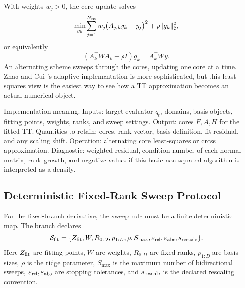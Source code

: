 \documentclass[11pt]{article}
\numberwithin{equation}{section}
\begin{document}
With weights \(w_j>0\), the core update solves
\begin{equation}
    \min_{g_k}
    \sum_{j=1}^{N_{\rm fit}}w_j\bigl(A_{j,k}g_k-y_j\bigr)^2
    +\rho\|g_k\|_2^2,
    \label{eq:p24-a1-2c}
\end{equation}
or equivalently
\begin{equation}
    (A_k^\top W A_k+\rho I)g_k=A_k^\top Wy.
    \label{eq:p24-a1-2d}
\end{equation}
An alternating scheme sweeps through the cores, updating one core at a time.
Zhao and Cui \cite{zhao2024ttsequential}'s adaptive implementation is more sophisticated, but this least-
squares view is the easiest way to see how a TT approximation becomes an
actual numerical object.

Implementation meaning. Inputs: target evaluator \(q_t\), domains,
basis objects, fitting points, weights, ranks, and sweep settings.  Output:
cores \(F,A,H\) for the fitted TT.  Quantities to retain: cores, rank vector, basis
definition, fit residual, and any scaling shift.  Operation: alternating core
least-squares or cross approximation.  Diagnostic: weighted residual, condition
number of each normal matrix, rank growth, and negative values if this basic
non-squared algorithm is interpreted as a density.

\subsection*{Deterministic Fixed-Rank Sweep Protocol}

For the fixed-branch derivative, the sweep rule must be a finite deterministic
map.  The branch declares
\begin{equation}
    \mathcal S_{\rm fit}
    =
    \{Z_{\rm fit},W,R_{0:D},p_{1:D},\rho,S_{\max},
      \varepsilon_{\rm rel},\varepsilon_{\rm abs},s_{\rm rescale}\}.
    \label{eq:p24-p23-sweep1}
\end{equation}
Here \(Z_{\rm fit}\) are fitting points, \(W\) are weights, \(R_{0:D}\) are
fixed ranks, \(p_{1:D}\) are basis sizes, \(\rho\) is the ridge parameter,
\(S_{\max}\) is the maximum number of bidirectional sweeps,
\(\varepsilon_{\rm rel},\varepsilon_{\rm abs}\) are stopping tolerances, and
\(s_{\rm rescale}\) is the declared rescaling convention.
\end{document}
